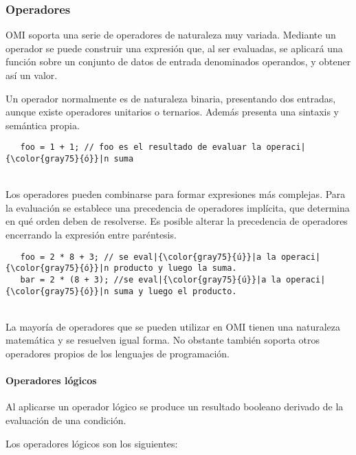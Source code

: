 \subsubsection{Operadores}
OMI soporta una serie de operadores de naturaleza muy variada. Mediante un operador se puede construir una expresión que, al ser evaluadas, se aplicará una función
sobre un conjunto de datos de entrada denominados operandos, y obtener así un valor.

Un operador normalmente es de naturaleza binaria, presentando dos entradas, aunque existe operadores unitarios o ternarios. Además presenta una sintaxis y semántica propia. \\

\begin{lstlisting}
   foo = 1 + 1; // foo es el resultado de evaluar la operaci|{\color{gray75}{ó}}|n suma
\end{lstlisting} 
\hfill\\

Los operadores pueden combinarse para formar expresiones más complejas. Para la evaluación se establece una precedencia de operadores implícita, que determina en qué orden 
deben de resolverse. Es posible alterar la precedencia de operadores encerrando la expresión entre paréntesis. \\

\begin{lstlisting}
   foo = 2 * 8 + 3; // se eval|{\color{gray75}{ú}}|a la operaci|{\color{gray75}{ó}}|n producto y luego la suma.
   bar = 2 * (8 + 3); //se eval|{\color{gray75}{ú}}|a la operaci|{\color{gray75}{ó}}|n suma y luego el producto.
\end{lstlisting} 
\hfill\\

La mayoría de operadores que se pueden utilizar en OMI tienen una naturaleza matemática y se resuelven igual forma. No obstante también soporta otros operadores propios de
los lenguajes de programación. 

\paragraph{Operadores lógicos}\label{sec:op_bool}

Al aplicarse un operador lógico se produce un resultado booleano derivado de la evaluación de una condición. 

Los operadores lógicos son los siguientes:

